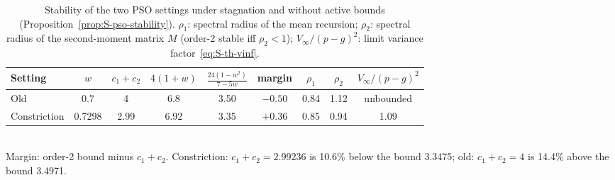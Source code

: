 \begin{table}[!htbp]
\centering
\caption{Stability of the two PSO settings under stagnation and without active bounds (Proposition~\ref{prop:S-pso-stability}). $\rho_1$: spectral radius of the mean recursion; $\rho_2$: spectral radius of the second-moment matrix $M$ (order-2 stable iff $\rho_2<1$); $V_\infty/(p-g)^2$: limit variance factor~\eqref{eq:S-th-vinf}.}
\label{tab:S-th-settings}
\begin{tabular}{lcccccccc}
\toprule
Setting & $w$ & $c_1+c_2$ & $4(1+w)$ & $\frac{24(1-w^2)}{7-5w}$ & margin & $\rho_1$ & $\rho_2$ & $V_\infty/(p-g)^2$\\
\midrule
Old & 0.7 & 4 & 6.8 & 3.50 & $-0.50$ & 0.84 & 1.12 & unbounded\\
Constriction & 0.7298 & 2.99 & 6.92 & 3.35 & $+0.36$ & 0.85 & 0.94 & 1.09\\
\bottomrule
\end{tabular}
\\[2pt]{\footnotesize Margin: order-2 bound minus $c_1+c_2$. Constriction: $c_1+c_2=2.99236$ is 10.6\% below the bound 3.3475; old: $c_1+c_2=4$ is 14.4\% above the bound 3.4971.}
\end{table}


